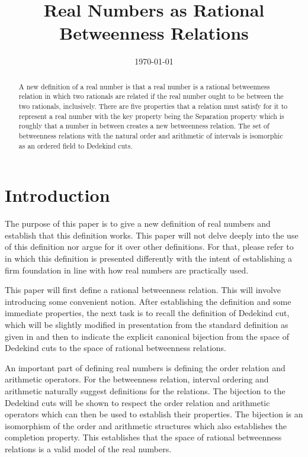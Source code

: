 \documentclass[12pt]{article}
\title{Real Numbers as Rational Betweenness Relations}
\date{\today}
\begin{document}
\maketitle
\begin{abstract}
A new definition of a real number is that a real number is a rational betweenness relation in which two rationals are related if the real number ought to be between the two rationals, inclusively. There are five properties that a relation must satisfy for it to represent a real number with the key property being the Separation property which is roughly that a number in between creates a new betweenness relation. The set of betweenness relations with the natural order and arithmetic of intervals is isomorphic as an ordered field to Dedekind cuts. 
\end{abstract}

\section{Introduction}

The purpose of this paper is to give a new definition of real numbers and establish that this definition works. This paper will not delve deeply into the use of this definition nor argue for it over other definitions. For that, please refer to \cite{taylor23main} in which this definition is presented differently with the intent of establishing a firm foundation in line with how real numbers are practically used.

This paper will first define a rational betweenness relation. This will involve introducing some convenient notion. After establishing the definition and some immediate properties, the next task is to recall the definition of Dedekind cut, which will be slightly modified in presentation from the standard definition as given in \cite{rudin} and then to indicate the explicit canonical bijection from the space of Dedekind cuts to the space of rational betweenness relations. 

An important part of defining real numbers is defining the order relation and arithmetic operators. For the betweenness relation, interval ordering and arithmetic naturally suggest definitions for the relations. The bijection to the Dedekind cuts will be shown to respect the order relation and arithmetic operators which can then be used to establish their properties. The bijection is an isomorphism of the order and arithmetic structures which also establishes the completion property.  This establishes that the space of rational betweenness relations is a valid model of the real numbers. 
\end{document}
